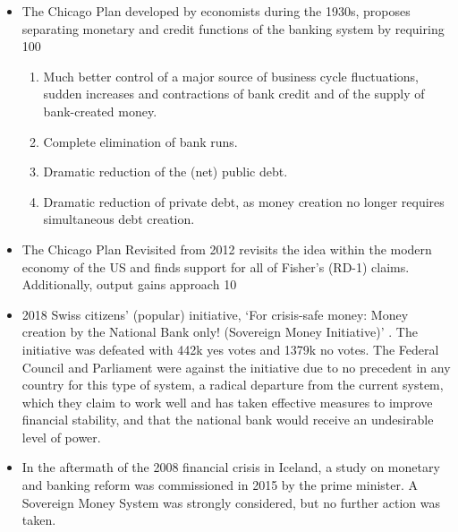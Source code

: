 \begin{itemize}
    \item The Chicago Plan \cite{fisher1936} developed by economists during the 1930s, proposes separating monetary and credit functions of the banking system by requiring 100%
    \begin{enumerate}
        \item Much better control of a major source of business cycle fluctuations, sudden increases and contractions of bank credit and of the supply of bank-created money.
        \item Complete elimination of bank runs.
        \item Dramatic reduction of the (net) public debt.
        \item Dramatic reduction of private debt, as money creation no longer requires simultaneous debt creation.
        \end{enumerate}
        \item The Chicago Plan Revisited \cite{chicagorevisited} from 2012 revisits the idea within the modern economy of the US and finds support for all of Fisher's (RD-1) claims. Additionally, output gains approach 10%
        \item 2018 Swiss citizens’ (popular) initiative, ‘For crisis-safe money: Money creation by the National Bank only! (Sovereign Money Initiative)’ \cite{SwizzInitiative}. The initiative was defeated with 442k yes votes and 1379k no votes. The Federal Council and Parliament were against the initiative due to no precedent in any country for this type of system, a radical departure from the current system, which they claim to work well and has taken effective measures to improve financial stability, and that the national bank would receive an undesirable level of power.
        \item In the aftermath of the 2008 financial crisis in Iceland, a study on monetary and banking reform \cite{IcelandReport} was commissioned in 2015 by the prime minister. A Sovereign Money System was strongly considered, but no further action was taken.
\end{itemize}